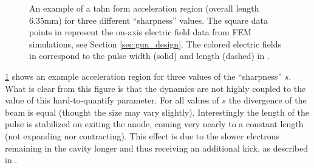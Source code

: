 \begin{figure}
  \centerline{
    \subfloat[][]{
      \label{fig:field_on_axis}
      
    }
    \subfloat[][]{
      \label{fig:tanh_sharpness}
      
    }
  }
  \caption[An example of a tahn form acceleration region for three different ``sharpness'' values]{
    An example of a tahn form acceleration region (overall length 6.35mm) for three different ``sharpness'' values.
    The square data points in \protect{} represent the on-axis electric field data from FEM simulations, see Section \ref{sec:gun_design}.
    The colored electric fields in \protect{} correspond to the pulse width (solid) and length (dashed) in \protect{}.
  }
  \label{fig:gun-sharpness}
\end{figure}

\ref{fig:gun-sharpness} shows an example acceleration region for three values of the ``sharpness'' $s$.
What is clear from this figure is that the dynamics are not highly coupled to the value of this hard-to-quantify parameter.
For all values of $s$ the divergence of the beam is equal (thought the size may vary slightly).
Interestingly the length of the pulse is stabilized on exiting the anode, coming very nearly to a constant length (not expanding nor contracting).
This effect is due to the slower electrons remaining in the cavity longer and thus receiving an additional kick, as described in \cite{oudheusden_electron_2007}.

